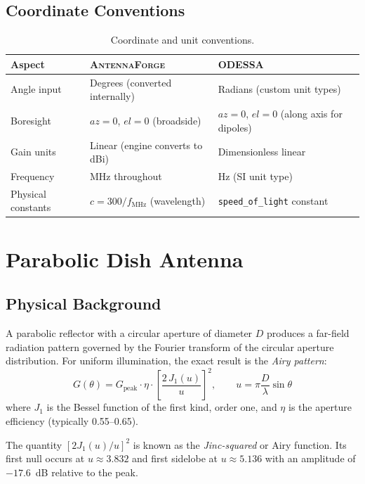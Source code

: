 \documentclass[11pt,a4paper]{article}
\newcommand{\AF}{\textsc{AntennaForge}}
\newcommand{\OD}{\textsc{ODESSA}}
\begin{document}
\subsection{Coordinate Conventions}

\begin{table}[H]
\centering
\caption{Coordinate and unit conventions.}
\small
\begin{tabularx}{\textwidth}{l X X}
\toprule
\textbf{Aspect} & \textbf{\AF{}} & \textbf{\OD{}} \\
\midrule
Angle input & Degrees (converted internally) & Radians (custom unit types) \\
Boresight & $az = 0$, $el = 0$ (broadside) & $az = 0$, $el = 0$ (along axis for dipoles) \\
Gain units & Linear (engine converts to dBi) & Dimensionless linear \\
Frequency & MHz throughout & Hz (SI unit type) \\
Physical constants & $c = 300/f_\text{MHz}$ (wavelength) & \texttt{speed\_of\_light} constant \\
\bottomrule
\end{tabularx}
\end{table}

\section{Parabolic Dish Antenna}
\label{sec:dish}

\subsection{Physical Background}

A parabolic reflector with a circular aperture of diameter $D$ produces a
far-field radiation pattern governed by the Fourier transform of the circular
aperture distribution.  For uniform illumination, the exact result is the
\emph{Airy pattern}:
\begin{equation}
  G(\theta) = G_{\text{peak}} \cdot \eta \cdot
    \left[ \frac{2\,J_1(u)}{u} \right]^2,
  \qquad
  u = \pi \frac{D}{\lambda} \sin\theta
  \label{eq:airy}
\end{equation}
where $J_1$ is the Bessel function of the first kind, order one, and $\eta$ is
the aperture efficiency (typically 0.55--0.65).

The quantity $[2J_1(u)/u]^2$ is known as the \emph{Jinc-squared} or Airy
function.  Its first null occurs at $u \approx 3.832$ and first sidelobe at
$u \approx 5.136$ with an amplitude of $-17.6$~dB relative to the peak.
\end{document}
